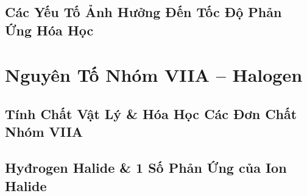 \documentclass[oneside]{book}
\numberwithin{equation}{section}
\begin{document}

\section{Các Yếu Tố Ảnh Hưởng Đến Tốc Độ Phản Ứng Hóa Học}


\chapter{Nguyên Tố Nhóm VIIA -- Halogen}

\section{Tính Chất Vật Lý \& Hóa Học Các Đơn Chất Nhóm VIIA}


\section{Hyđrogen Halide \& 1 Số Phản Ứng của Ion Halide} 


\printbibliography[heading=bibintoc]
	
\end{document}
